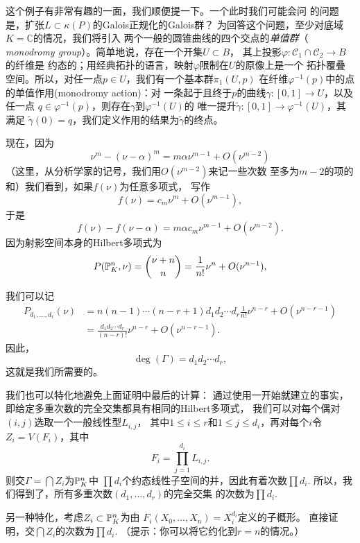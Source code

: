 这个例子有非常有趣的一面，我们顺便提一下。一个此时我们可能会问
的问题是，扩张$L\subset \kappa(P)$的Galois正规化的Galois群？
为回答这个问题，至少对底域$K=\mathbb C$的情况，我们将引入
两个一般的圆锥曲线的四个交点的\textit{单值群}（
\textit{monodromy group}）。简单地说，存在一个开集$U\subset B$，
其上投影$\varphi:\mathscr C_1\cap \mathscr C_2\to B$的纤维是
约态的；用经典拓扑的语言，映射$\varphi$限制在$U$的原像上是一个
拓扑覆叠空间。所以，对任一点$p\in U$，我们有一个基本群$\pi_1(U,p)$
在纤维$\varphi^{-1}(p)$中的点的单值作用(monodromy action)：对
一条起于且终于$p$的曲线$\gamma:[0,1]\to U$，以及任一点
$q\in \varphi^{-1}(p)$，则存在$\gamma$到$\varphi^{-1}(U)$的
唯一提升$\tilde\gamma:[0,1]\to \varphi^{-1}(U)$，其满足
$\tilde\gamma(0)=q$，我们定义作用的结果为$\tilde\gamma$的终点。
\nottran


现在，因为
\[
	\nu^m-(\nu-\alpha)^m=m\alpha\nu^{m-1}+O(\nu^{m-2})
\]
（这里，从分析学家的记号，我们用$O(\nu^{m-2})$来记一些次数
至多为$m-2$的项的和）我们看到，如果$f(\nu)$为任意多项式，
写作
\[
	f(\nu)=c_m\nu^m+O(\nu^{m-1}),
\]
于是
\[
	f(\nu)-f(\nu-\alpha)=m\alpha c_m\nu^{m-1}+O(\nu^{m-2}).
\]
因为射影空间本身的Hilbert多项式为
\[
	P(\P_K^n,\nu)=\binom{\nu+n}{n}=\frac{1}{n!}\nu^n+
	O(\nu^{n-1}),
\]


我们可以记
\begin{align*}
P_{d_1,\dots,d_r}(\nu)&=n(n-1)\cdots (n-r+1)d_1d_2\cdots
	d_r\frac 1{n!} \nu^{n-r}+O(\nu^{n-r-1})\\
&=\frac{d_1d_2\cdots d_r}{(n-r)!}\nu^{n-r}+O(\nu^{n-r-1}).
\end{align*}
因此，
\[
	\deg(\Gamma)=d_1d_2\cdots d_r,
\]
这就是我们所需要的。

我们也可以特化地避免上面证明中最后的计算：
通过使用一开始就建立的事实，
即给定多重次数的完全交集都具有相同的Hilbert多项式，
我们可以对每个偶对$(i,j)$选取一个一般线性型$L_{i,j}$，
其中$1\leq i\leq r$和$1\leq j\leq d_i$，再对每个$i$令
$Z_i=V(F_i)$，其中
\[
	F_i=\prod_{j=1}^{d_i}L_{i,j}.
\]
则交$\Gamma=\bigcap Z_i$为$\P_K^n$中
$\prod d_i$个约态线性子空间的并，因此有着次数$\prod d_i$.
所以，我们得到了，所有多重次数$(d_1,\dots,d_r)$的完全交集
的次数为$\prod d_i$.

\begin{exe}\label{exe:3.77}
另一种特化，考虑$Z_i\subset \P_K^n$为由
$F_i(X_0,\dots,X_n)=X_i^{d_i}$定义的子概形。
直接证明，交$\bigcap Z_i$的次数为$\prod d_i$. 
（提示：你可以将它约化到$r=n$的情况。）
\end{exe}

